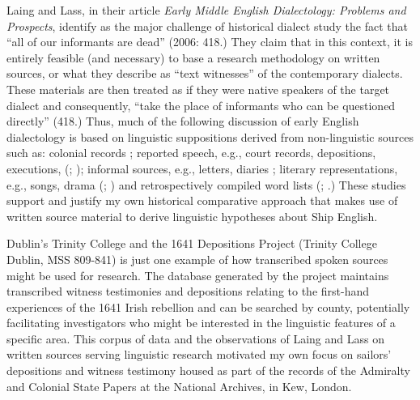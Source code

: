 Laing and Lass, in their article \textit{Early Middle English Dialectology: Problems and Prospects}, identify as the major challenge of historical dialect study the fact that “all of our informants are dead” (2006: 418.) They claim that in this context, it is entirely feasible (and necessary) to base a research methodology on written sources, or what they describe as “text witnesses” of the contemporary dialects. These materials are then treated as if they were native speakers of the target dialect and consequently, “take the place of informants who can be questioned directly” (418.) Thus, much of the following discussion of early English dialectology is based on linguistic suppositions derived from non-linguistic sources such as: colonial records \citep{Maynor1988}; reported speech, e.g., court records, depositions, executions, (\citealt{Awbery1988}; \citealt{Tagliamonte2013}); informal sources, e.g., letters, diaries \citep{Tagliamonte2013}; literary representations, e.g., songs, drama (\citealt{Russell1883}; \citealt{Wright1967}) and retrospectively compiled word lists (\citealt{Wright1967}; \citealt{Smith1968}.) These studies support and justify my own historical comparative approach that makes use of written source material to derive linguistic hypotheses about Ship English. 

Dublin’s Trinity College and the 1641 Depositions Project (Trinity College Dublin, MSS 809-841) is just one example of how transcribed spoken sources might be used for research. The database generated by the project maintains transcribed witness testimonies and depositions relating to the first-hand experiences of the 1641 Irish rebellion and can be searched by county, potentially facilitating investigators who might be interested in the linguistic features of a specific area. This corpus of data and the observations of Laing and Lass on written sources serving linguistic research motivated my own focus on sailors’ depositions and witness testimony housed as part of the records of the Admiralty and Colonial State Papers at the National Archives, in Kew, London. 

